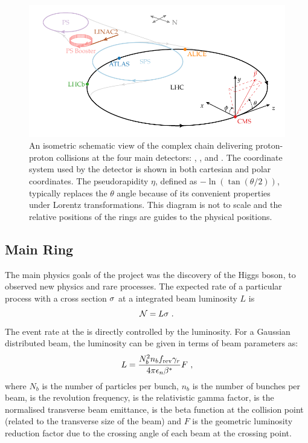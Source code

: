 \begin{figure}[!htbp]
    \centering
    \includegraphics{diagrams/tikz/lhc_complex/lhc_complex.pdf}
    \caption{
        An isometric schematic view of the \LHC complex chain delivering
        proton-proton collisions at the four main detectors: \LHCb, \ATLAS,
        \ALICE and \CMS. The coordinate system used by the \CMS detector is
        shown in both cartesian and polar coordinates. The pseudorapidity
        $\eta$, defined as $-\ln(\tan(\theta/2))$, typically replaces the
        $\theta$ angle because of its convenient properties under Lorentz
        transformations. This diagram is not to scale and the relative
        positions of the rings are guides to the physical positions.
    }
    \label{fig:LHC-Complex}
\end{figure}


\subsection{\LHC Main Ring}

The main physics goals of the \LHC project was the discovery of the Higgs
boson, to observed new physics and rare \SM processes. The expected rate of a
particular process with a cross section $\sigma$ at a integrated beam luminosity
$L$ is
%
\begin{equation}
    \mathcal{N} = L \sigma \ .
\end{equation}
%
The event rate at the \LHC is directly controlled by the luminosity. For a
Gaussian distributed beam, the luminosity can be given in terms of beam
parameters as:
%
\begin{equation}
    \label{eq:beam-lumi}
    L = \frac{N_b^2 n_bf_{\mathrm{rev}}\gamma_{r}}{4\pi\epsilon_n\beta^*} F\ ,
\end{equation}
%
where $N_b$ is the number of particles per bunch, $n_b$ is the number of
bunches per beam, \frev is the revolution frequency, \relgamma is the
relativistic gamma factor, \emitt is the normalised transverse beam emittance,
\bstar is the beta function at the collision point (related to the transverse
size of the beam) and $F$ is the geometric luminosity reduction factor due to
the crossing angle of each beam at the crossing point.

